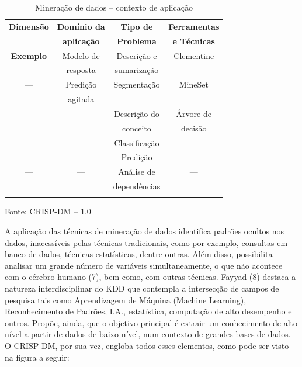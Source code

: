 \documentclass[conference,compsoc]{IEEEtran}
\begin{document}
\begin{table}[!ht]

\caption{Mineração de dados -- contexto de aplicação \cite{Chapman2000}}
\vspace{1mm}
\centering
\begin{tabular}{c|c|c|c}
\textbf{Dimensão} & \textbf{Domínio da} & \textbf{Tipo de } & \textbf{Ferramentas } \\
		  & \textbf{aplicação}  & \textbf{Problema} & \textbf{e Técnicas}   \\ \hline
\textbf{Exemplo}  & Modelo de           & Descrição e       & Clementine  \\
                  & resposta            & sumarização       &             \\ \hline
      --- 	  & Predição            & Segmentação       & MineSet     \\
         	  & agitada             &                   &             \\ \hline
      ---         & ---                 & Descrição do      & Árvore de   \\
                  &                     & conceito          & decisão     \\ \hline
      ---         & ---                 & Classificação     & ---         \\ \hline
      ---         & ---                 & Predição          & ---         \\ \hline
      ---         & ---                 & Análise de        & ---         \\
                  &                     & dependências      & \\            
\\
\end{tabular}
\tiny Fonte: CRISP-DM -- 1.0
\end{table}

A aplicação das técnicas de mineração de dados identifica padrões
ocultos nos dados, inacessíveis pelas técnicas tradicionais, como por
exemplo, consultas em banco de dados, técnicas estatísticas, dentre
outras. Além disso, possibilita analisar um grande número de variáveis
simultaneamente, o que não acontece com o cérebro humano (7), bem
como, com outras técnicas.
Fayyad (8) destaca a natureza interdisciplinar do
KDD que contempla a intersecção de campos de pesquisa tais como
Aprendizagem de Máquina (Machine Learning), Reconhecimento de
Padrões, I.A., estatística, computação de alto desempenho e outros.
Propõe, ainda, que o objetivo principal é extrair um conhecimento de alto
nível a partir de dados de baixo nível, num contexto de grandes bases
de dados. O CRISP-DM, por sua vez, engloba todos esses elementos, como pode ser visto na figura a seguir:
\end{document}
